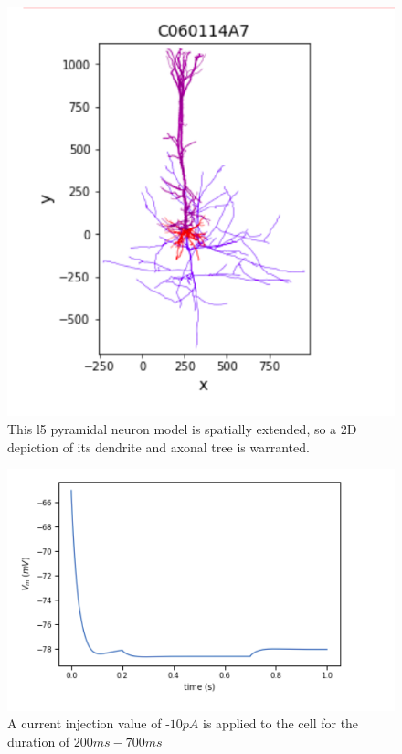 \begin{figure}%
  \begin{center}
    \includegraphics[scale=0.8]{figures/morphology_view.png}
    \caption[l5 pyramidal neuron tree]{This l5 pyramidal neuron model is spatially extended, so a 2D depiction of its dendrite and axonal tree is warranted.}
  \label{fig:brief_shape}
  \end{center}
\end{figure}

\begin{figure}%
  \begin{center}
    \includegraphics[scale=0.8]{figures/correct_passive_l5pc.png}
    \caption[plot of negative amplitude current stimulus]{A current injection value of -$10pA$ is applied to the cell for the duration of $200ms-700ms$}
  \label{fig:passive_properties}
  \end{center}
\end{figure}



